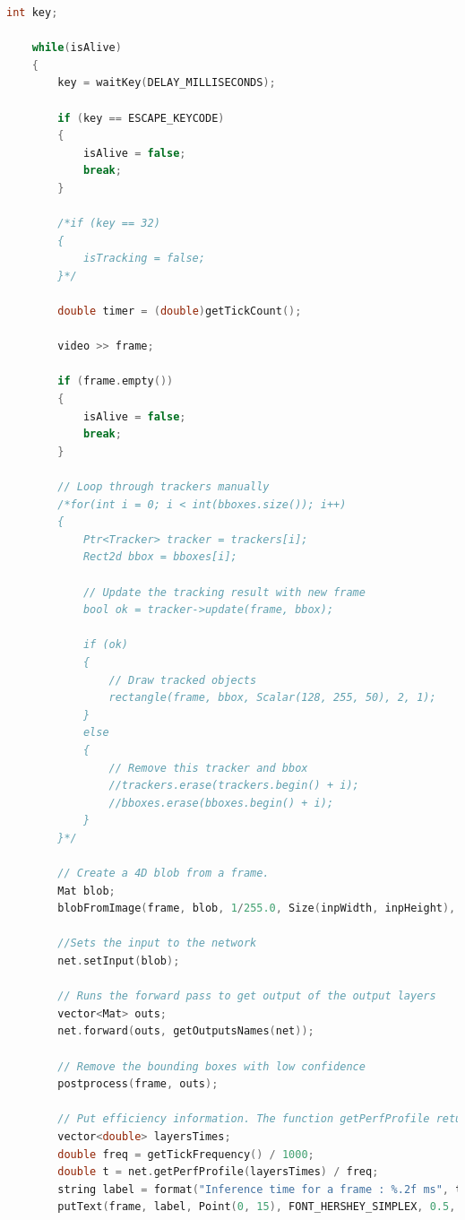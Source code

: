 \begin{lstlisting}[language=C++, caption=main.cpp]
    int key;

    while(isAlive)
    {
        key = waitKey(DELAY_MILLISECONDS);

        if (key == ESCAPE_KEYCODE)
        {
            isAlive = false;
            break;
        }

        /*if (key == 32)
        {
            isTracking = false;
        }*/

        double timer = (double)getTickCount();

        video >> frame;

        if (frame.empty())
        {
            isAlive = false;
            break;
        }

        // Loop through trackers manually
        /*for(int i = 0; i < int(bboxes.size()); i++)
        {
            Ptr<Tracker> tracker = trackers[i];
            Rect2d bbox = bboxes[i];

            // Update the tracking result with new frame
            bool ok = tracker->update(frame, bbox);

            if (ok)
            {
                // Draw tracked objects
                rectangle(frame, bbox, Scalar(128, 255, 50), 2, 1);
            }
            else
            {
                // Remove this tracker and bbox
                //trackers.erase(trackers.begin() + i);
                //bboxes.erase(bboxes.begin() + i);
            }
        }*/

        // Create a 4D blob from a frame.
        Mat blob;
        blobFromImage(frame, blob, 1/255.0, Size(inpWidth, inpHeight), Scalar(0,0,0), true, false);

        //Sets the input to the network
        net.setInput(blob);

        // Runs the forward pass to get output of the output layers
        vector<Mat> outs;
        net.forward(outs, getOutputsNames(net));

        // Remove the bounding boxes with low confidence
        postprocess(frame, outs);

        // Put efficiency information. The function getPerfProfile returns the overall time for inference(t) and the timings for each of the layers(in layersTimes)
        vector<double> layersTimes;
        double freq = getTickFrequency() / 1000;
        double t = net.getPerfProfile(layersTimes) / freq;
        string label = format("Inference time for a frame : %.2f ms", t);
        putText(frame, label, Point(0, 15), FONT_HERSHEY_SIMPLEX, 0.5, Scalar(0, 0, 255));


\end{lstlisting}
